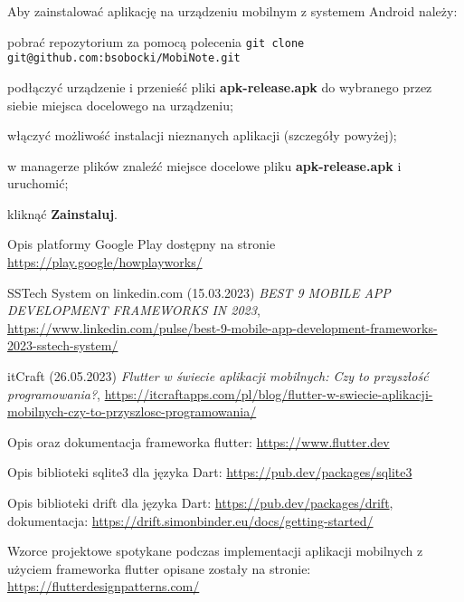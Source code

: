 \documentclass[shortabstract]{iithesis}
\begin{document}
Aby zainstalować aplikację na urządzeniu mobilnym z systemem Android należy:
\begin{compactitem}
    \setlength\itemsep{0mm}
    \item pobrać repozytorium za pomocą polecenia
    \newline
    \verb|git clone git@github.com:bsobocki/MobiNote.git|
    \item podłączyć urządzenie i przenieść pliki \textbf{apk-release.apk} do wybranego przez siebie miejsca docelowego na urządzeniu;
    \item włączyć możliwość instalacji nieznanych aplikacji (szczegóły powyżej);
    \item w managerze plików znaleźć miejsce docelowe pliku \textbf{apk-release.apk} i uruchomić;
    \item kliknąć \textbf{Zainstaluj}.
\end{compactitem}










\begin{thebibliography}{1}
Opis platformy Google Play dostępny na stronie \url{https://play.google/howplayworks/}

SSTech System on linkedin.com (15.03.2023) \emph{BEST 9 MOBILE APP DEVELOPMENT FRAMEWORKS IN 2023}, \url{https://www.linkedin.com/pulse/best-9-mobile-app-development-frameworks-2023-sstech-system/}

itCraft (26.05.2023) \emph{Flutter w świecie aplikacji mobilnych: Czy to przyszłość programowania?}, \url{https://itcraftapps.com/pl/blog/flutter-w-swiecie-aplikacji-mobilnych-czy-to-przyszlosc-programowania/}

Opis oraz dokumentacja frameworka flutter: \url{https://www.flutter.dev}

Opis biblioteki sqlite3 dla języka Dart: \url{https://pub.dev/packages/sqlite3}

Opis biblioteki drift dla języka Dart: \url{https://pub.dev/packages/drift}, dokumentacja: \url{https://drift.simonbinder.eu/docs/getting-started/}

Wzorce projektowe spotykane podczas implementacji aplikacji mobilnych z użyciem frameworka flutter opisane zostały na stronie: \url{https://flutterdesignpatterns.com/}

\end{thebibliography}
\end{document}
